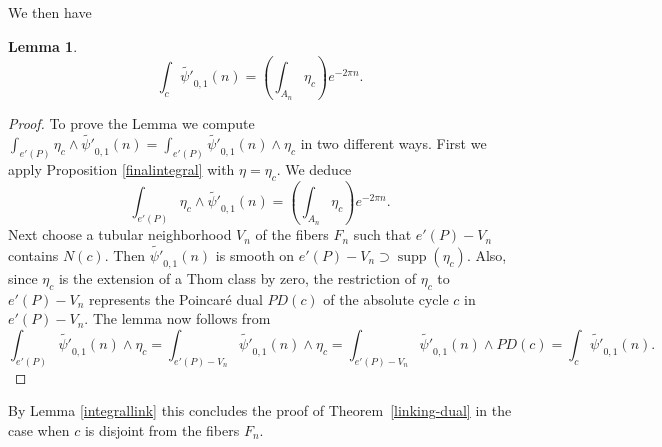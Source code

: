 \documentclass[12pt,leqno]{amsart}
\numberwithin{equation}{section}
\theoremstyle{plain}
\newtheorem{lemma}[theorem]{Lemma}
\theoremstyle{definition}
\theoremstyle{remark}
\newcommand{\supp}{\operatorname{supp}}
\begin{document}
We then have

\begin{lemma} \label{laststep}
\begin{equation*} \label{fifthformula}
\int_c \tilde{\psi'}_{0,1}(n) = \left(\int_{A_n} \eta_c\right) e^{- 2\pi n}.
\end{equation*}
\end{lemma}

\begin{proof}
To prove the Lemma we compute $\int_{e'(P)} \eta_c \wedge  \tilde{\psi'}_{0,1}(n)= \int_{e'(P)} \tilde{\psi'}_{0,1}(n) \wedge \eta_c$ in two different ways. First we apply Proposition \ref{finalintegral} with $\eta = \eta_c$.  We deduce
\begin{equation*}\label{thirdformula}
\int_{e'(P)}\eta_c \wedge \tilde{\psi'}_{0,1}(n) = \left(\int_{A_n} \eta_c\right) e^{-2 \pi n}.
\end{equation*}
Next choose a tubular neighborhood $V_n$ of the fibers $F_n$   such that $e'(P) - V_n$
contains $N(c)$.  Then $\tilde{\psi'}_{0,1}(n)$ is smooth on $e'(P) - V_n \supset \supp (\eta_c)$.  Also, since $\eta_c$ is the extension of a Thom class by zero,  the restriction of  $\eta_c$ to $e'(P) - V_n$ represents the Poincar\'e dual $PD(c)$ of the absolute cycle $c$ in 
$e'(P) -V_n$. The lemma now follows from 
\begin{equation*}
\int_{e'(P)} \tilde{\psi'}_{0,1}(n) \wedge \eta_c   = \int_{e'(P)- V_n} \tilde{\psi'}_{0,1}(n) \wedge \eta_c = \int_{e'(P)- V_n} \tilde{\psi'}_{0,1}(n) \wedge PD(c)
  = \int_{c} \tilde{\psi'}_{0,1}(n). 
\end{equation*}
\end{proof}

By Lemma \ref{integrallink} this concludes the proof of Theorem~\ref{linking-dual} in the case when $c$ is disjoint from the fibers $F_n$.
\end{document}
